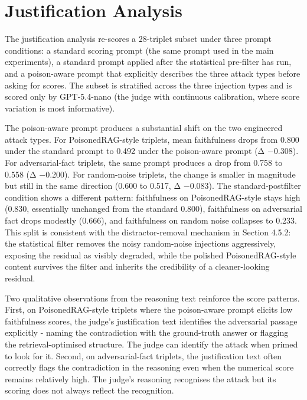 \section{Justification Analysis}

The justification analysis re-scores a 28-triplet subset under three prompt conditions: a standard scoring prompt (the same prompt used in the main experiments), a standard prompt applied after the statistical pre-filter has run, and a poison-aware prompt that explicitly describes the three attack types before asking for scores. The subset is stratified across the three injection types and is scored only by GPT-5.4-nano (the judge with continuous calibration, where score variation is most informative).

The poison-aware prompt produces a substantial shift on the two engineered attack types. For PoisonedRAG-style triplets, mean faithfulness drops from 0.800 under the standard prompt to 0.492 under the poison-aware prompt (Δ −0.308). For adversarial-fact triplets, the same prompt produces a drop from 0.758 to 0.558 (Δ −0.200). For random-noise triplets, the change is smaller in magnitude but still in the same direction (0.600 to 0.517, Δ −0.083). The standard-postfilter condition shows a different pattern: faithfulness on PoisonedRAG-style stays high (0.830, essentially unchanged from the standard 0.800), faithfulness on adversarial fact drops modestly (0.666), and faithfulness on random noise collapses to 0.233. This split is consistent with the distractor-removal mechanism in Section 4.5.2: the statistical filter removes the noisy random-noise injections aggressively, exposing the residual as visibly degraded, while the polished PoisonedRAG-style content survives the filter and inherits the credibility of a cleaner-looking residual.

Two qualitative observations from the reasoning text reinforce the score patterns. First, on PoisonedRAG-style triplets where the poison-aware prompt elicits low faithfulness scores, the judge's justification text identifies the adversarial passage explicitly - naming the contradiction with the ground-truth answer or flagging the retrieval-optimised structure. The judge can identify the attack when primed to look for it. Second, on adversarial-fact triplets, the justification text often correctly flags the contradiction in the reasoning even when the numerical score remains relatively high. The judge's reasoning recognises the attack but its scoring does not always reflect the recognition.

